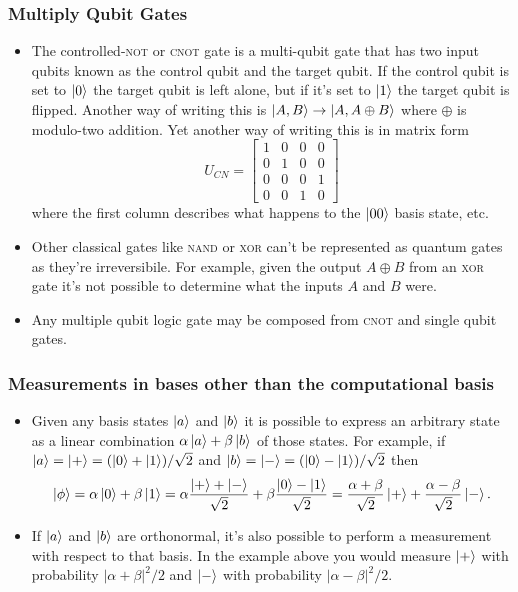 \documentclass{article}
\begin{document}
\subsubsection{Multiply Qubit Gates}

\begin{itemize}
  \item The controlled-\textsc{not} or \textsc{cnot} gate is a multi-qubit gate that has two input qubits known as the control qubit and the target qubit. If the control qubit is set to $\ket{0}$ the target qubit is left alone, but if it's set to $\ket{1}$ the target qubit is flipped. Another way of writing this is $\ket{A, B} \rightarrow \ket{A, A \oplus B}$ where $\oplus$ is modulo-two addition. Yet another way of writing this is in matrix form \[U_{CN} = \begin{bmatrix}
            1 & 0 & 0 & 0 \\
            0 & 1 & 0 & 0 \\
            0 & 0 & 0 & 1 \\
            0 & 0 & 1 & 0
          \end{bmatrix}\] where the first column describes what happens to the $\ket{00}$ basis state, etc.

  \item Other classical gates like \textsc{nand} or \textsc{xor} can't be represented as quantum gates as they're irreversibile. For example, given the output $A \oplus B$ from an \textsc{xor} gate it's not possible to determine what the inputs $A$ and $B$ were.

  \item Any multiple qubit logic gate may be composed from \textsc{cnot} and single qubit gates.
\end{itemize}

\subsubsection{Measurements in bases other than the computational basis}

\begin{itemize}
  \item Given any basis states $\ket{a}$ and $\ket{b}$ it is possible to express an arbitrary state as a linear combination $\alpha \ket{a} + \beta \ket{b}$ of those states. For example, if $\ket{a} = \ket{+} = (\ket{0} + \ket{1}) / \sqrt{2}$ and $\ket{b} = \ket{-} = (\ket{0} - \ket{1}) / \sqrt{2}$ then \[\ket{\phi} = \alpha \ket{0} + \beta \ket{1} = \alpha \frac{\ket{+} + \ket{-}}{\sqrt{2}} + \beta \frac{\ket{0} - \ket{1}}{\sqrt{2}} = \frac{\alpha + \beta}{\sqrt{2}} \ket{+} + \frac{\alpha - \beta}{\sqrt{2}} \ket{-}.\]

  \item If $\ket{a}$ and $\ket{b}$ are orthonormal, it's also possible to perform a measurement with respect to that basis. In the example above you would measure $\ket{+}$ with probability $|\alpha + \beta|^2 / 2$ and $\ket{-}$ with probability $|\alpha - \beta|^2 / 2$.
\end{itemize}
\end{document}

